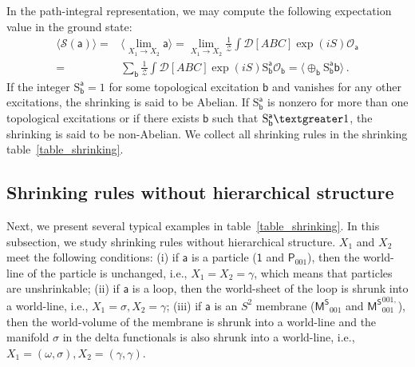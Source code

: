 \documentclass[11pt,nofootinbib,preprint]{revtex4-1}
\begin{document}
In the path-integral representation, we may compute the following expectation value in the ground state:
\begin{align}
	\langle \mathcal{S} \left( \mathsf{a} \right) \rangle =&\langle \underset{X_1\rightarrow X_2}{\lim}\mathsf{a} \rangle =\underset{X_1\rightarrow X_2}{\lim}\frac{1}{\mathcal{Z}}\int{\mathcal{D} \left[ ABC \right] \exp \left( iS \right) \mathcal{O} _{\mathsf{a}}} \nonumber
	\\
	=&\sum_{\mathsf{b}}\frac{1}{\mathcal{Z}}\int{\mathcal{D} \left[ ABC \right] \exp \left( iS \right) \mathrm{S}_{\mathsf{b}}^{\mathsf{a}}\mathcal{O} _{\mathsf{b}}} =\langle \oplus_{\mathsf{b}}\mathrm{S}_{\mathsf{b}}^{\mathsf{a}}\mathsf{b} \rangle \,.
	\label{eq_shrinking_pathintegral}
\end{align}
 If the integer $\mathrm{S}_{\mathsf{b}}^{\mathsf{a}}=1$ for some topological excitation $\mathsf{b}$ and vanishes for any other excitations,  the shrinking is said to be Abelian. If $\mathrm{S}_{\mathsf{b}}^{\mathsf{a}}$ is nonzero for more than one topological excitations or if there exists $\mathsf{b}$ such that  $\mathrm{S}_{\mathsf{b}}^{\mathsf{a}}\textgreater 1$,  the shrinking is said to be non-Abelian. We collect all shrinking rules in the  shrinking table~\ref{table_shrinking}.
 
 
 
 
\subsection{Shrinking rules without hierarchical structure\label{section_shrinking_nohier}}
Next, we present several typical examples in table~\ref{table_shrinking}.  In this subsection, we study shrinking rules without hierarchical structure. $X_1$ and $X_2$ meet the following conditions: (i) if $\mathsf{a}$ is a particle ($\mathsf{1}$ and $\mathsf{P}_{001}$), then the world-line of the particle is unchanged, i.e., $X_1=X_2=\gamma$, which means that particles are unshrinkable; (ii) if $\mathsf{a}$ is a loop, then the world-sheet of the loop is shrunk into a world-line, i.e., $X_1=\sigma, X_2=\gamma$; (iii) if $\mathsf{a}$ is an $S^2$ membrane ($\mathsf{M^S}_{001}$ and $\mathsf{M^S}_{001}^{001,}$), then the world-volume  of the membrane is shrunk into a world-line and the manifold $\sigma$ in the delta functionals is also shrunk into a world-line, i.e., $X_1=(\omega,\sigma), X_2=(\gamma,\gamma)$.
\end{document}
